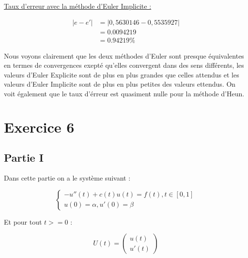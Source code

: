 \documentclass[12pt, letterpaper]{article}
\begin{document}
\begin{enumerate}
\begin{enumerate}
  \underline{Taux d'erreur avec la méthode d'Euler Implicite :}

  \begin{equation*}
    \begin{split}
      \left\lvert e - e' \right\rvert & = \left\lvert 0,5630146 - 0,5535927
        \right\rvert \\
        & = 0.0094219 \\
        & = 0.94219 \%
    \end{split}
  \end{equation*}

  Nous voyons clairement que les deux méthodes d'Euler sont presque
  équivalentes en termes de convergences exepté qu'elles convergent
  dans des sens différents, les valeurs d'Euler Explicite sont de plus
  en plus grandes que celles attendus et les valeurs d'Euler Implicite
  sont de plus en plus petites des valeurs ettendus.
  On voit également que le taux d'érreur est quasiment nulle pour la
  méthode d'Heun.
\end{enumerate}

\end{enumerate}

\section*{Exercice 6}

\subsection*{Partie I}

Dans cette partie on a le système suivant :

\begin{equation*}
  \left\{
  \begin{array}{l}
    -u''(t) + c(t)u(t) = f(t),  t \in [0,1] \\
    u(0) = \alpha, u'(0) = \beta
  \end{array}
  \right.
\end{equation*}

Et pour tout $t >= 0$ :

\begin{equation*}
  U(t) = \left(
  \begin{array}{l}
    u(t) \\
    u'(t)
  \end{array}
  \right)
\end{equation*}
\end{document}
